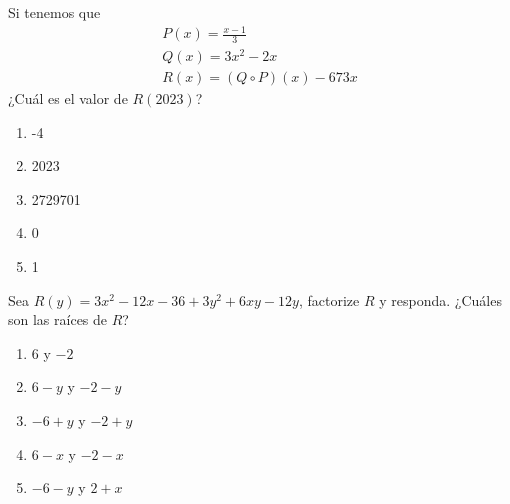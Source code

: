 \begin{section-problem}
    Si tenemos que
    \begin{align*}
        P(x) = \frac{x - 1}{3} \\
        Q(x) = 3x^2 - 2x \\
        R(x) = (Q \circ P)(x) - 673x
    \end{align*}
    ¿Cuál es el valor de $R(2023)$?
    \begin{multicols}{5}
        \begin{enumerate}
            \item -4
            \item 2023
            \item 2729701
            \item 0
            \item 1
        \end{enumerate}
    \end{multicols}
\end{section-problem}

\begin{section-problem}
    Sea $R(y) = 3x^2 - 12x - 36 + 3y^2 + 6xy - 12y$, factorize $R$ y responda.
    ¿Cuáles son las raíces de $R$?
    \begin{multicols}{3}
        \begin{enumerate}
            \item $6$ y $-2$
            \item $6 - y$ y $-2 - y$
            \item $-6 + y$ y $-2 + y$
            \item $6 - x$ y $-2 - x$
            \item $-6 - y$ y $2 + x$
        \end{enumerate}
    \end{multicols}
\end{section-problem}
